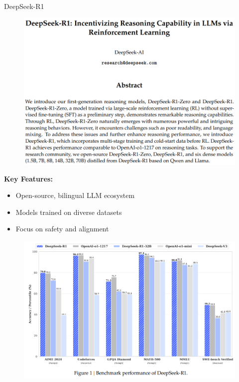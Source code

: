 \begin{frame}[allowframebreaks]{DeepSeek-R1}
    \begin{figure}
        \centering
        \includegraphics[height=0.88\textheight,width=1.05\textwidth,keepaspectratio]{images/recent-advance/deepseek-paper.png}
    \end{figure}
\framebreak

    \textbf{Key Features:}
    \begin{itemize}
        \item Open-source, bilingual LLM ecosystem
        \item Models trained on diverse datasets
        \item Focus on safety and alignment
    \end{itemize}
\framebreak
    \begin{figure}
        \centering
        \includegraphics[height=0.88\textheight,width=1.05\textwidth,keepaspectratio]{images/recent-advance/deepseek-performance.png}
    \end{figure}
\end{frame}


